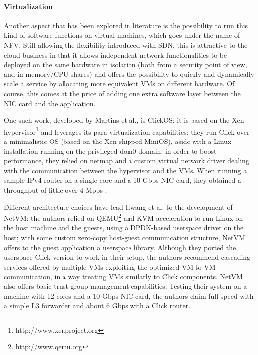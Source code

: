 \documentclass[paper=a4, fontsize=11pt]{scrartcl}
\begin{document}
\paragraph{Virtualization} Another aspect that has been explored in literature is the possibility to run this kind of software functions on virtual machines, which goes under the name of \acrfull{NFV}.
Still allowing the flexibility introduced with \gls{SDN}, this is attractive to the cloud business in that it allows independent network functionalities to be deployed on the same hardware in isolation (both from a security point of view, and in memory/CPU shares) and offers the possibility to quickly and dynamically scale a service by allocating more equivalent VMs on different hardware. Of course, this comes at the price of adding one extra software layer between the NIC card and the application.

One such work, developed by Martins et al.\cite{clickos}, is ClickOS: it is based on the Xen hypervisor\footnote{http://www.xenproject.org} and leverages its para-virtualization capabilities: they run Click over a minimalistic OS (based on the Xen-shipped MiniOS), aside with a Linux installation running on the privileged dom0 domain: in order to boost performance, they relied on netmap\cite{netmap} and a custom virtual network driver dealing with the communication between the hypervisor and the VMs. When running a sample IPv4 router on a single core and a 10 Gbps NIC card, they obtained a throughput of little over 4 Mpps .


Different architecture choices have lead Hwang et al. to the development of NetVM\cite{netvm}: the authors relied on QEMU\footnote{http://www.qemu.org} and KVM acceleration to run Linux on the host machine and the guests, using a DPDK-based userspace driver on the host; with some custom zero-copy host-guest communication structure, NetVM offers to the guest application a userspace library. Although they ported the userspace Click version to work in their setup, the authors recommend cascading services offered by multiple VMs exploiting the optimized VM-to-VM communication, in a way treating VMs similarly to Click components. NetVM also offers basic trust-group management capabilities. Testing their system on a machine with 12 cores and a 10 Gbps NIC card, the authors claim full speed with a simple L3 forwarder and about 6 Gbps with a Click router.
\end{document}
